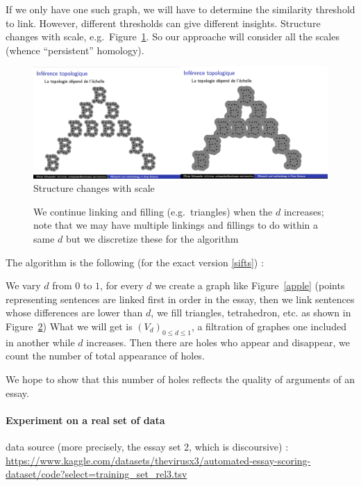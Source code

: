 If we only have one such graph, we will have to determine the similarity threshold to link.
However, different thresholds can give different insights. Structure changes with scale, e.g.\ Figure~\ref{fig:scale}.
So our approache will consider all the scales (whence ``persistent'' homology).

\begin{figure}[H]
\centering
\includegraphics[width=14cm]{scale.png}
\caption{Structure changes with scale}
\label{fig:scale}
\end{figure}

\begin{figure}[H]
\centering

\caption{We continue linking and filling (e.g.\ triangles) when the $d$ increases; note that
we may have multiple linkings and fillings to do within a same $d$ but we discretize these
for the algorithm}
\label{filtration}
\end{figure}

The algorithm is the following (for the exact version \ref{sifts}) :

We vary $d$ from $0$ to $1$, for every $d$ we create a graph like Figure~\ref{apple}
(points representing sentences are linked first in order in the essay,
then we link sentences whose differences are lower than $d$,
we fill triangles, tetrahedron, etc. as shown in Figure~\ref{filtration}) What we will get is
$(V_d)_{0\le d\le 1}$, a filtration of graphes one included in another while $d$ increases.
Then there are holes who appear and disappear, we count the number of total appearance of holes.

We hope to show that this number of holes reflects the quality of arguments of an essay.

\paragraph{Experiment on a real set of data}

data source (more precisely, the essay set 2, which is discoursive) :
\url{https://www.kaggle.com/datasets/thevirusx3/automated-essay-scoring-dataset/code?select=training_set_rel3.tsv}

